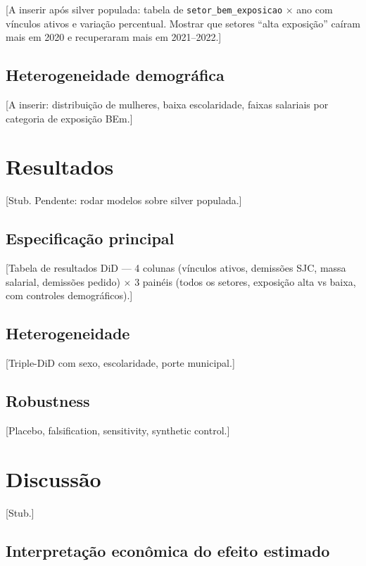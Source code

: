\documentclass[12pt,a4paper,oneside]{article}
\begin{document}
[A inserir após silver populada: tabela de
\texttt{setor\_bem\_exposicao} $\times$ ano com vínculos ativos
e variação percentual. Mostrar que setores ``alta exposição''
caíram mais em 2020 e recuperaram mais em 2021--2022.]

\subsection{Heterogeneidade demográfica}

[A inserir: distribuição de mulheres, baixa escolaridade,
faixas salariais por categoria de exposição BEm.]

\section{Resultados}

[Stub. Pendente: rodar modelos sobre silver populada.]

\subsection{Especificação principal}

[Tabela de resultados DiD --- 4 colunas (vínculos ativos, demissões SJC,
massa salarial, demissões pedido) $\times$ 3 painéis (todos os setores,
exposição alta vs baixa, com controles demográficos).]

\subsection{Heterogeneidade}

[Triple-DiD com sexo, escolaridade, porte municipal.]

\subsection{Robustness}

[Placebo, falsification, sensitivity, synthetic control.]

\section{Discussão}

[Stub.]

\subsection{Interpretação econômica do efeito estimado}
\end{document}
